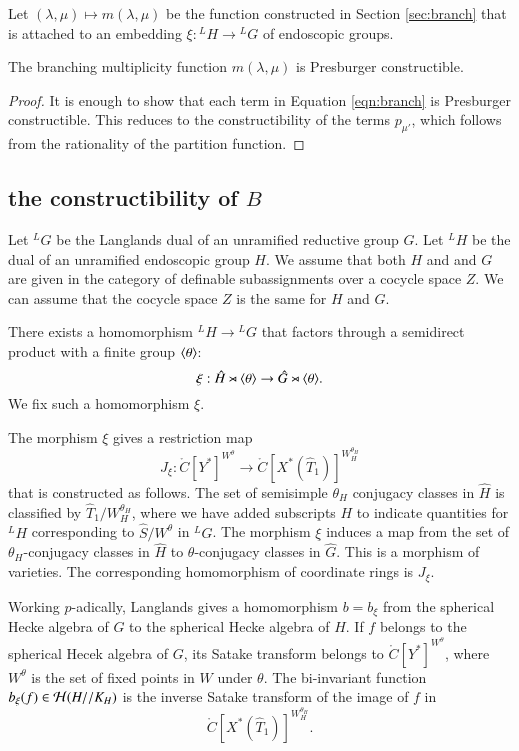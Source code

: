 \bigskip 

Let $(\lambda,\mu)\mapsto m(\lambda,\mu)$ be the function constructed
in Section \ref{sec:branch} that is attached to an embedding
$\xi:{}^LH\to {}^LG$ of endoscopic groups.

\begin{lemma}\label{lemma:branch} 
  The branching multiplicity function $m(\lambda,\mu)$ is Presburger
  constructible.
\end{lemma}

\begin{proof} 
  It is enough to show that each term in Equation \ref{eqn:branch} is
  Presburger constructible.  This reduces to the constructibility of
  the terms $p_{\mu'}$, which follows from the rationality of the
  partition function.
\end{proof}


\subsection{the constructibility of $B$}\label{sec:B}

Let ${}^LG$ be the Langlands dual of an unramified reductive group
$G$.  Let ${}^LH$ be the dual of an unramified endoscopic group $H$.
We assume that both $H$ and and $G$ are given in the category of
definable subassignments over a cocycle space $Z$.  We can assume that
the cocycle space $Z$ is the same for $H$ and $G$.

There exists a homomorphism ${}^LH\to {}^LG$ that factors through a
semidirect product with a finite group $\langle{\theta}\rangle$:
\[
\xi:\hat H \rtimes \langle{\theta}\rangle \to \hat G \rtimes \langle{\theta}\rangle.
\]
We fix such a homomorphism $\xi$.  

The morphism $\xi$ gives a restriction map
\begin{equation}
J_\xi:\ring{C}[Y^*]^{W^\theta} \to \ring{C}[X^*(\hat T_1)]^{W_H^{\theta_H}}
\end{equation}
that is constructed as follows.  The set of semisimple $\theta_H$
conjugacy classes in $\hat H$ is classified by $\hat
T_1/W_H^{\theta_H}$, where we have added subscripts $H$ to indicate
quantities for ${}^LH$ corresponding to $\hat S/W^\theta$ in ${}^LG$.
The morphism $\xi$ induces a map from the set of $\theta_H$-conjugacy
classes in $\hat H$ to $\theta$-conjugacy classes in $\hat G$.  This
is a morphism of varieties. The corresponding homomorphism of
coordinate rings is $J_\xi$.

Working $p$-adically, Langlands gives a homomorphism
$b = b_\xi$ from the spherical Hecke algebra of $G$ to the spherical
Hecke algebra of $H$.  If $f$ belongs to the spherical Hecek algebra
of $G$, its Satake transform belongs to $\ring{C}[Y^*]^{W^\theta}$,
where $W^\theta$ is the set of fixed points in $W$ under $\theta$.
The bi-invariant function $b_\xi(f)\in\mathcal H(H//K_H)$ is the inverse
Satake transform of the image of $f$ in
\[
\ring{C}[X^*(\hat T_1)]^{W_H^{\theta_H}}.
\]


